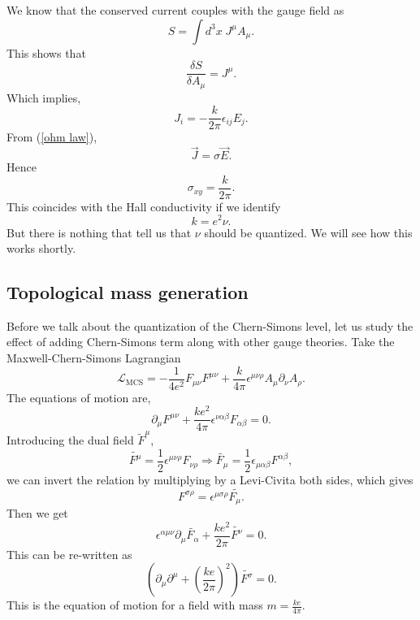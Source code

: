 \documentclass{article}
\begin{document}
We know that the conserved current couples with the gauge field as
\begin{equation*}
	S=\int d^3x\;J^\mu A_\mu. 
\end{equation*}
This shows that 
\begin{equation*}
	\frac{\delta S}{\delta A_\mu}=J^{\mu}.
\end{equation*}
Which implies,
\begin{equation}
	J_i=-\frac{k}{2\pi}\epsilon_{ij}E_j.
\end{equation}
From (\ref{ohm law}),
\begin{equation*}
	\vec{J}=\sigma\vec{E}.
\end{equation*}
Hence
\begin{equation*}
	\sigma_{xy}=\frac{k}{2\pi}.
\end{equation*}
This coincides with the Hall conductivity if we identify
\begin{equation}\label{ch level quantized}
	k=e^2\nu.
\end{equation}
But there is nothing that tell us that $\nu$ should be quantized. We will see how this works shortly.
\subsection{Topological mass generation}
Before we talk about the quantization of the Chern-Simons level, let us study the effect of adding Chern-Simons term along with other gauge theories. Take the Maxwell-Chern-Simons Lagrangian
\begin{equation}
	\mathcal{L}_{\text{{MCS}}}=-\frac{1}{4e^2}F_{\mu\nu}F^{\mu\nu}+\frac{k}{4\pi}\epsilon^{\mu\nu\rho}A_{\mu}\partial_{\nu}A_{\rho}.
\end{equation}
The equations of motion are,
\begin{equation}
	\partial_{\mu}F^{\mu\nu}+\frac{ke^2}{4\pi}\epsilon^{\nu\alpha\beta}F_{\alpha\beta}=0.
\end{equation}
Introducing the dual field $\tilde{F}^\mu$, 
\begin{equation}
	\tilde{F^{\mu}}=\frac{1}{2}\epsilon^{\mu\nu\rho}F_{\nu\rho}\Rightarrow\tilde{F_{\mu}}=\frac{1}{2}\epsilon_{\mu\alpha\beta}F^{\alpha\beta},
\end{equation}
we can invert the relation by multiplying by a Levi-Civita both sides, which gives
\begin{equation}
	F^{\sigma\rho}=\epsilon^{\mu\sigma\rho}\tilde{F_{\mu}.}
\end{equation}
Then we get
\begin{equation*}
	\epsilon^{\alpha\mu\nu}\partial_{\mu}\tilde{F_{\alpha}}+\frac{ke^2}{2\pi}\tilde{F^{\nu}}=0.
\end{equation*}
This can be re-written as 
\begin{equation}
	\left(\partial_{\mu}\partial^{\mu}+\left(\frac{ke}{2\pi}\right)^{2}\right)\tilde{F^{\sigma}}=0.
\end{equation}
This is the equation of motion for a field with mass $m=\frac{ke}{4\pi}$.  
\end{document}
